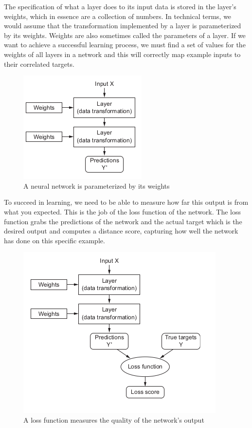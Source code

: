 The specification of what a layer does to its input data is stored in the layer’s weights,
which in essence are a collection of numbers.
In technical terms, we would assume that the transformation implemented by a layer is parameterized by its weights.
Weights are also sometimes called the parameters of a layer.
If we want to achieve a successful learning process, we must find a set of values for the weights of all
layers in a network and this will correctly
map example inputs to their correlated targets.

\begin{figure}[H]
    \centering
    \includegraphics[scale=1.]{./images/background/params.png}
    \caption{A neural network is parameterized by its weights}
    \label{fig:params}
\end{figure}

To succeed in learning, we need to be able to measure how far this output is from what you expected.
This is the job of the loss function of the network.
The loss function grabs the predictions of the network and the actual target which is the desired
output and computes a distance score,
capturing how well the network has done on this specific example.

\begin{figure}[H]
    \centering
    \includegraphics[scale=1.]{./images/background/loss.png}
    \caption{A loss function measures the quality of the network’s output}
    \label{fig:loss}
\end{figure}

